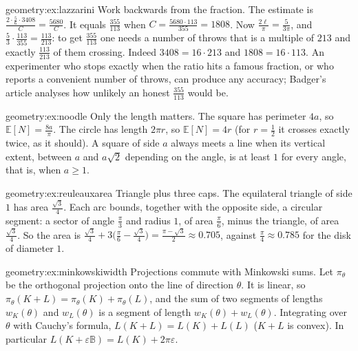 \begin{solution}{geometry:ex:lazzarini}
\idea Work backwards from the fraction.
\writeup The estimate is $\frac{2\cdot\frac56\cdot3408}C=\frac{5680}C$. It equals $\frac{355}{113}$ when $C=\frac{5680\cdot113}{355}=1808$. Now $\frac{2\ell}\pi=\frac5{3\pi}$, and
$\frac53\cdot\frac{113}{355}=\frac{113}{213}$: to get $\frac{355}{113}$ one needs a number of throws that is a multiple of $213$ and exactly $\frac{113}{213}$ of them
crossing. Indeed $3408=16\cdot213$ and $1808=16\cdot113$. An experimenter who stops exactly when the ratio hits a famous fraction, or who reports a convenient
number of throws, can produce any accuracy; Badger's article analyses how unlikely an honest $\frac{355}{113}$ would be.
\end{solution}

\begin{solution}{geometry:ex:noodle}
\idea Only the length matters.
\writeup The square has perimeter $4a$, so $\mathbb E[N]=\frac{8a}\pi$. The circle has length $2\pi r$, so $\mathbb E[N]=4r$ (for $r=\frac12$ it crosses exactly twice, as
it should). A square of side $a$ always meets a line when its vertical extent, between $a$ and $a\sqrt2$ depending on the angle, is at least $1$ for every angle,
that is, when $a\ge1$.
\end{solution}

\begin{solution}{geometry:ex:reuleauxarea}
\idea Triangle plus three caps.
\writeup The equilateral triangle of side $1$ has area $\frac{\sqrt3}4$. Each arc bounds, together with the opposite side, a circular segment: a sector of angle
$\frac\pi3$ and radius $1$, of area $\frac\pi6$, minus the triangle, of area $\frac{\sqrt3}4$. So the area is
$\frac{\sqrt3}4+3\bigl(\frac\pi6-\frac{\sqrt3}4\bigr)=\frac{\pi-\sqrt3}2\approx0.705$, against $\frac\pi4\approx0.785$ for the disk of diameter $1$.
\end{solution}

\begin{solution}{geometry:ex:minkowskiwidth}
\idea Projections commute with Minkowski sums.
\writeup Let $\pi_\theta$ be the orthogonal projection onto the line of direction $\theta$. It is linear, so $\pi_\theta(K+L)=\pi_\theta(K)+\pi_\theta(L)$, and the sum of two
segments of lengths $w_K(\theta)$ and $w_L(\theta)$ is a segment of length $w_K(\theta)+w_L(\theta)$. Integrating over $\theta$ with Cauchy's formula,
$L(K+L)=L(K)+L(L)$ ($K+L$ is convex). In particular $L(K+\varepsilon\mathbb B)=L(K)+2\pi\varepsilon$.
\end{solution}

